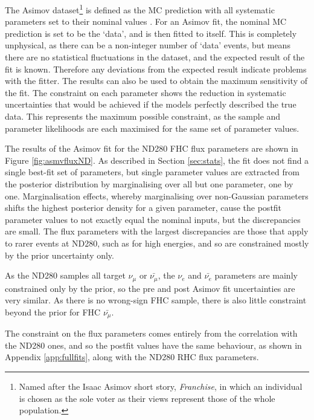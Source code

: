 The Asimov dataset\footnote{Named after the Isaac Asimov short story, \textit{Franchise}, in which an individual is chosen as the sole voter as their views represent those of the whole population.} is defined as the MC prediction with all systematic parameters set to their nominal values \cite{Cowan_2011}. For an Asimov fit, the nominal MC prediction is set to be the `data', and is then fitted to itself. This is completely unphysical, as there can be a non-integer number of `data' events, but means there are no statistical fluctuations in the dataset, and the expected result of the fit is known. Therefore any deviations from the expected result indicate problems with the fitter. The results can also be used to obtain the maximum sensitivity of the fit. The constraint on each parameter shows the reduction in systematic uncertainties that would be achieved if the models perfectly described the true data. This represents the maximum possible constraint, as the sample and parameter likelihoods are each maximised for the same set of parameter values.

The results of the Asimov fit for the ND280 FHC flux parameters are shown in Figure \ref{fig:asmvfluxND}. As described in Section \ref{sec:stats}, the fit does not find a single best-fit set of parameters, but single parameter values are extracted from the posterior distribution by marginalising over all but one parameter, one by one. Marginalisation effects, whereby marginalising over non-Gaussian parameters shifts the highest posterior density for a given parameter, cause the postfit parameter values to not exactly equal the nominal inputs, but the discrepancies are small. The flux parameters with the largest discrepancies are those that apply to rarer events at ND280, such as for high energies, and so are constrained mostly by the prior uncertainty only.

As the ND280 samples all target $\nu_{\mu}$ or $\bar{\nu_{\mu}}$, the $\nu_e$ and $\bar{\nu_e}$ parameters are mainly constrained only by the prior, so the pre and post Asimov fit uncertainties are very similar. As there is no wrong-sign FHC sample, there is also little constraint beyond the prior for FHC $\bar{\nu_{\mu}}$. 

The constraint on the \SK flux parameters comes entirely from the correlation with the ND280 ones, and so the postfit values have the same behaviour, as shown in Appendix \ref{app:fullfits}, along with the ND280 RHC flux parameters.

